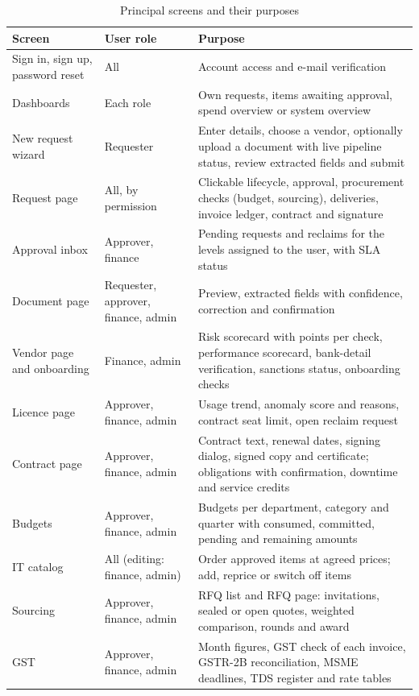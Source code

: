 \begin{table}[!htbp]
\centering\tablestyle
\caption{Principal screens and their purposes}\label{tab:screens}
\begin{tabularx}{\textwidth}{|L{0.22\textwidth}|L{0.20\textwidth}|Y|}
\hline
\textbf{Screen} & \textbf{User role} & \textbf{Purpose} \\ \hline
Sign in, sign up, password reset & All & Account access and e-mail verification \\ \hline
Dashboards & Each role & Own requests, items awaiting approval, spend overview or system overview \\ \hline
New request wizard & Requester & Enter details, choose a vendor, optionally upload a document with live pipeline status, review extracted fields and submit \\ \hline
Request page & All, by permission & Clickable lifecycle, approval, procurement checks (budget, sourcing), deliveries, invoice ledger, contract and signature \\ \hline
Approval inbox & Approver, finance & Pending requests and reclaims for the levels assigned to the user, with SLA status \\ \hline
Document page & Requester, approver, finance, admin & Preview, extracted fields with confidence, correction and confirmation \\ \hline
Vendor page and onboarding & Finance, admin & Risk scorecard with points per check, performance scorecard, bank-detail verification, sanctions status, onboarding checks \\ \hline
Licence page & Approver, finance, admin & Usage trend, anomaly score and reasons, contract seat limit, open reclaim request \\ \hline
Contract page & Approver, finance, admin & Contract text, renewal dates, signing dialog, signed copy and certificate; obligations with confirmation, downtime and service credits \\ \hline
Budgets & Approver, finance, admin & Budgets per department, category and quarter with consumed, committed, pending and remaining amounts \\ \hline
IT catalog & All (editing: finance, admin) & Order approved items at agreed prices; add, reprice or switch off items \\ \hline
Sourcing & Approver, finance, admin & RFQ list and RFQ page: invitations, sealed or open quotes, weighted comparison, rounds and award \\ \hline
GST & Approver, finance, admin & Month figures, GST check of each invoice, GSTR-2B reconciliation, MSME deadlines, TDS register and rate tables \\ \hline

\end{tabularx}
\end{table}
